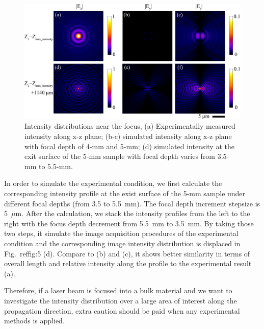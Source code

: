\documentclass[9pt,twocolumn,twoside]{osajnl}
\begin{document}
\begin{figure}
	\centering
	\includegraphics[width=\linewidth]{../AppOptics/figures/50xPolarization.pdf}
	\caption{Intensity distributions near the focus, (a) Experimentally measured intensity along x-z plane; (b-c) simulated intensity along x-z plane with focal depth of 4-mm and 5-mm; (d) simulated intensity at the exit surface of the 5-mm sample with focal depth varies from 3.5-mm to 5.5-mm.}\label{fig:6}
\end{figure}

In order to simulate the experimental condition, we first calculate the corresponding intensity profile at the exist surface of the 5-mm sample under different focal depths (from 3.5 to 5.5~mm). The focal depth increment stepsize is 5~$\mu$m. After the calculation, we stack the intensity profiles from the left to the right with the focus depth decrement from 5.5~mm to 3.5~mm. By taking those two steps, it simulate the image acquisition procedures of the experimental condition and the corresponding image intensity distribution is displaced in Fig.~ref{fig:5} (d). Compare to (b) and (c), it shows better similarity in terms of overall length and relative intensity along the profile to the experimental result (a).

Therefore, if a laser beam is focused into a bulk material and we want to investigate the intensity distribution over a large area of interest along the propagation direction, extra caution should be paid when any experimental methods is applied. 
\end{document}
